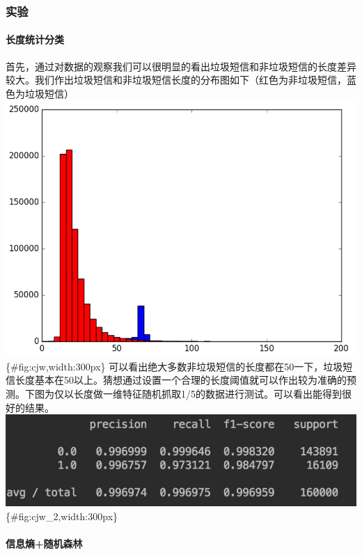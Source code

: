 \documentclass{article}
\begin{document}
\subsubsection{实验}\label{ux5b9eux9a8c}

\paragraph{长度统计分类}\label{ux957fux5ea6ux7edfux8ba1ux5206ux7c7b}

首先，通过对数据的观察我们可以很明显的看出垃圾短信和非垃圾短信的长度差异较大。我们作出垃圾短信和非垃圾短信长度的分布图如下（红色为非垃圾短信，蓝色为垃圾短信）
\includegraphics{./images/cjw-1.png}\{\#fig:cjw,width:300px\}
可以看出绝大多数非垃圾短信的长度都在50一下，垃圾短信长度基本在50以上。猜想通过设置一个合理的长度阈值就可以作出较为准确的预测。下图为仅以长度做一维特征随机抓取1/5的数据进行测试。可以看出能得到很好的结果。
\includegraphics{./images/cjw-2.png}\{\#fig:cjw\_2,width:300px\}

\paragraph{信息熵+随机森林}\label{ux4fe1ux606fux71b5ux968fux673aux68eeux6797}
\end{document}
